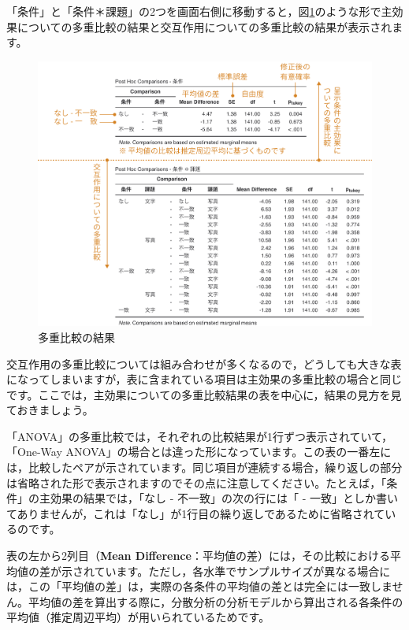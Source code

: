 \documentclass[
  12pt,
  a5jpaper,
  lualatex, ja=standard]{bxjsbook}
\begin{document}
「条件」と「条件＊課題」の2つを画面右側に移動すると，図\ref{fig:ANOVA-anova-posthoc-results}のような形で主効果についての多重比較の結果と交互作用についての多重比較の結果が表示されます。

\begin{figure}[!ht]

{\centering \includegraphics[width=1\linewidth]{images/ANOVA/anova-posthoc-results} 

}

\caption{多重比較の結果}\label{fig:ANOVA-anova-posthoc-results}
\end{figure}

交互作用の多重比較については組み合わせが多くなるので，どうしても大きな表になってしまいますが，表に含まれている項目は主効果の多重比較の場合と同じです。ここでは，主効果についての多重比較結果の表を中心に，結果の見方を見ておきましょう。

「ANOVA」の多重比較では，それぞれの比較結果が1行ずつ表示されていて，「One-Way ANOVA」の場合とは違った形になっています。この表の一番左には，比較したペアが示されています。同じ項目が連続する場合，繰り返しの部分は省略された形で表示されますのでその点に注意してください。たとえば，「条件」の主効果の結果では，「なし - 不一致」の次の行には「 - 一致」としか書いてありませんが，これは「なし」が1行目の繰り返しであるために省略されているのです。

表の左から2列目（\textbf{Mean Difference}：平均値の差）には，その比較における平均値の差が示されています。ただし，各水準でサンプルサイズが異なる場合には，この「平均値の差」は，実際の各条件の平均値の差とは完全には一致しません。平均値の差を算出する際に，分散分析の分析モデルから算出される各条件の平均値（推定周辺平均）が用いられているためです。
\end{document}
